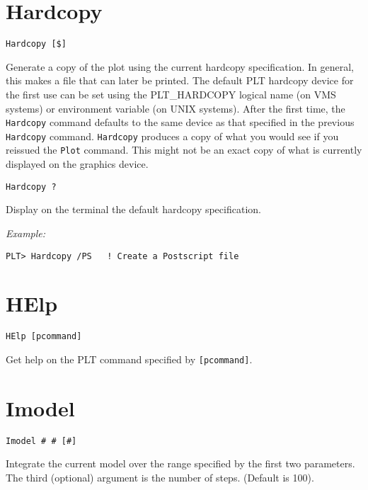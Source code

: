 \section*{Hardcopy}
\begin{verbatim}
Hardcopy [$]
\end{verbatim}
   Generate a copy of the plot using the current hardcopy specification.
In general, this makes a file that can later be printed.  The default
PLT hardcopy device for the first use can be set using the PLT\_HARDCOPY
logical name (on VMS systems) or environment variable (on UNIX systems).
After the first time, the {\tt Hardcopy} command defaults to the same
device as that specified in the previous {\tt Hardcopy} command.  {\tt Hardcopy}
produces a copy of what you would see if you reissued the {\tt Plot}
command.  This might not be an exact copy of what is currently displayed
on the graphics device.

\medskip
\begin{verbatim}
Hardcopy ?
\end{verbatim}
   Display on the terminal the default hardcopy specification.

\medskip\noindent
{\em Example:}
\begin{verbatim}
PLT> Hardcopy /PS   ! Create a Postscript file
\end{verbatim}

\section*{HElp}
\begin{verbatim}
HElp [pcommand]
\end{verbatim}
   Get help on the PLT command specified by {\tt [pcommand]}.

\section*{Imodel}
\begin{verbatim}
Imodel # # [#]
\end{verbatim}
   Integrate the current model over the range specified by the first
two parameters.  The third (optional) argument is the number of steps.
(Default is 100).

